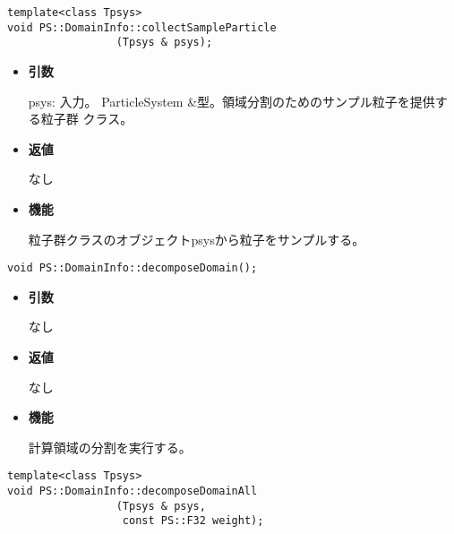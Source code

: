 \begin{screen}
\begin{verbatim}
template<class Tpsys>
void PS::DomainInfo::collectSampleParticle
                 (Tpsys & psys);
\end{verbatim}
\end{screen}

\begin{itemize}

\item {\bf 引数}

psys: 入力。 ParticleSystem \&型。領域分割のためのサンプル粒子を提供する粒子群
クラス。

\item {\bf 返値}

なし

\item {\bf 機能}

粒子群クラスのオブジェクトpsysから粒子をサンプルする。

\end{itemize}


\begin{screen}
\begin{verbatim}
void PS::DomainInfo::decomposeDomain();
\end{verbatim}
\end{screen}

\begin{itemize}

\item {\bf 引数}

なし

\item {\bf 返値}

なし

\item {\bf 機能}

計算領域の分割を実行する。

\end{itemize}


\begin{screen}
\begin{verbatim}
template<class Tpsys>
void PS::DomainInfo::decomposeDomainAll
                 (Tpsys & psys,
                  const PS::F32 weight);
\end{verbatim}
\end{screen}

